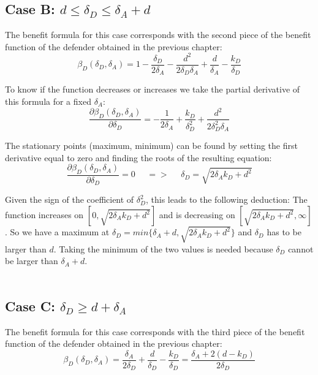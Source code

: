 \subsection*{Case B: $ d \leq\delta_{D} \leq \delta_{A} + d$}
The benefit formula for this case corresponds with the second piece of the benefit function of the defender obtained in the previous chapter:
\begin{equation*}
\beta_{D}(\delta_{D},\delta_{A}) = 1 - \dfrac{\delta_{D}}{2\delta_{A}} - \dfrac{d^{2}}{2\delta_{D}\delta_{A}} + \dfrac{d}{\delta_{A}}  - \dfrac{k_{D}}{\delta_{D}}
\end{equation*}

To know if the function decreases or increases we take the partial derivative of this formula for a fixed $\delta_{A}$:
\begin{equation*}\label{formdelta}
\frac{\partial \beta_{D}(\delta_{D},\delta_{A})}{\partial \delta_{D}} = - \dfrac{1}{2\delta_{A}} + \dfrac{k_{D}}{\delta_{D}^{2}} + \dfrac{d^{2}}{2\delta_{D}^{2}\delta_{A}}
\end{equation*}
 
The stationary points (maximum, minimum) can be found by setting the first derivative equal to zero and finding the roots of the resulting equation:
\begin{equation*}
\frac{\partial \beta_{D}(\delta_{D},\delta_{A})}{\partial \delta_{D}} =0 ~~~~~~ =>~~~~~~ \delta_{D} = \sqrt{2\delta_{A}k_{D} + d^{2}}
\end{equation*}

Given the sign of the coefficient of $\delta_{D}^{2}$, this
leads to the following deduction: The function increases on $[0, \sqrt{2\delta_{A}k_{D} + d^{2}}]$ and is decreasing on $[\sqrt{2\delta_{A}k_{D} + d^{2}}, \infty]$. So we have a maximum at $\delta_{D} = min \{ \delta_{A} +d, \sqrt{2\delta_{A}k_{D} + d^{2}} \} $ and $\delta_{D}$ has to be larger than $d$. Taking the minimum of the two values is needed because $\delta_{D}$ cannot be larger than $\delta_{A} +d$. \\
~~\\


\subsection*{Case C: $\delta_{D} \geq d+\delta_{A} $ }

The benefit formula for this case corresponds with the third piece of the benefit function of the defender obtained in the previous chapter:
\begin{equation*}
\beta_{D}(\delta_{D},\delta_{A})= \dfrac{\delta_{A}}{2\delta_{D}} + \dfrac{d}{\delta_{D}} - \dfrac{k_{D}}{\delta_{D}} = \dfrac{\delta_{A} + 2 (d-k_{D})}{2\delta_{D}}
\end{equation*}

